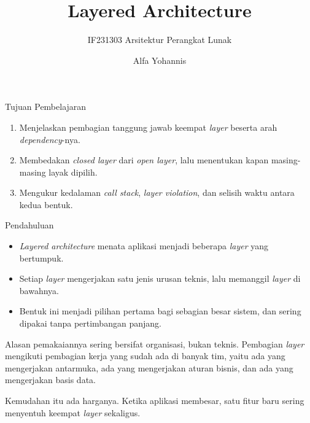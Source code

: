 \documentclass[aspectratio=169, table, 12pt]{beamer}
\title{\Huge{Layered Architecture}}
\subtitle{IF231303 Arsitektur Perangkat Lunak}
\author{Alfa Yohannis}
\begin{document}
\frame{\titlepage}

\begin{frame}{{\Large Tujuan Pembelajaran}}
  \vspace{10pt}
  \begin{enumerate}
    \item Menjelaskan pembagian tanggung jawab keempat \textit{layer} beserta arah
          \textit{dependency}-nya.
    \item Membedakan \textit{closed layer} dari \textit{open layer}, lalu menentukan
          kapan masing-masing layak dipilih.
    \item Mengukur kedalaman \textit{call stack}, \textit{layer violation}, dan
          selisih waktu antara kedua bentuk.
  \end{enumerate}
\end{frame}

\begin{frame}{{\Large Pendahuluan}}
  \vspace{8pt}
  \begin{itemize}
    \item \textit{Layered architecture} menata aplikasi menjadi beberapa
          \textit{layer} yang bertumpuk.
    \item Setiap \textit{layer} mengerjakan satu jenis urusan teknis, lalu memanggil
          \textit{layer} di bawahnya.
    \item Bentuk ini menjadi pilihan pertama bagi sebagian besar sistem, dan
          sering dipakai tanpa pertimbangan panjang.
  \end{itemize}

  \vspace{8pt}
  {\small Alasan pemakaiannya sering bersifat organisasi, bukan teknis.
  Pembagian \textit{layer} mengikuti pembagian kerja yang sudah ada di banyak tim,
  yaitu ada yang mengerjakan antarmuka, ada yang mengerjakan aturan bisnis, dan
  ada yang mengerjakan basis data.}

  \vspace{6pt}
  {\small Kemudahan itu ada harganya. Ketika aplikasi membesar, satu fitur baru
  sering menyentuh keempat \textit{layer} sekaligus.}
\end{frame}
\end{document}
